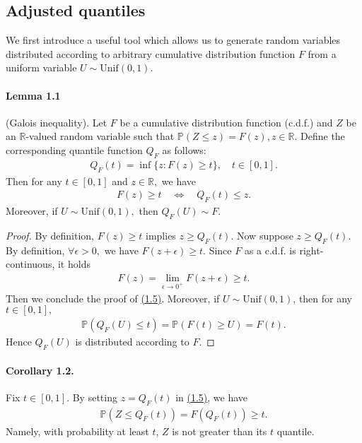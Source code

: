 \documentclass{article}
\numberwithin{equation}{section}
\begin{document}
\subsection{Adjusted quantiles}
We first introduce a useful tool which allows us to generate random variables distributed according to arbitrary cumulative distribution function $F$ from a uniform variable $U\sim\mathrm{Unif}(0,1).$
\paragraph{Lemma 1.1 \label{Lemma 1.1}} (Galois inequality). Let $F$ be a cumulative distribution function (c.d.f.) and $Z$ be an $\mathbb{R}$-valued random variable such that $\mathbb{P}(Z\leq z) = F(z), z\in\mathbb{R}.$ Define the corresponding quantile function $Q_F$ as follows:
\begin{align*}
	Q_F(t) = \inf\{z:F(z)\geq t\},\quad t\in[0,1].\tag{1.4}
\end{align*}
Then for any $t\in[0,1]$ and $z\in\mathbb{R},$ we have
\begin{align*}
	F(z)\geq t\quad\Leftrightarrow\quad Q_F(t)\leq z.\tag{1.5}\label{1.5}
\end{align*}
Moreover, if $U\sim\mathrm{Unif}(0,1),$ then $Q_F(U)\sim F.$
\begin{proof}
By definition, $F(z)\geq t$ implies $z\geq Q_F(t).$ Now suppose $z\geq Q_F(t).$ By definition, $\forall \epsilon >0,$ we have $F(z+\epsilon)\geq t.$ Since $F$ as a c.d.f. is right-continuous, it holds
\begin{align*}
	F(z) = \lim_{\epsilon\to 0^+}F(z+\epsilon) \geq t.\tag{1.6}
\end{align*}
Then we conclude the proof of \hyperref[1.5]{(1.5)}. Moreover, if $U\sim\mathrm{Unif}(0,1)$, then for any $t\in[0,1],$
\begin{align*}
	\mathbb{P}(Q_F(U)\leq t) = \mathbb{P}(F(t)\geq U) = F(t).\tag{1.7}
\end{align*}
Hence $Q_F(U)$ is distributed according to $F$.
\end{proof}

\paragraph{Corollary 1.2. \label{Corollary 1.2}} Fix $t\in [0,1].$ By setting $z=Q_F(t)$ in \hyperref[1.5]{(1.5)}, we have
\begin{align*}
	\mathbb{P}(Z\leq Q_F(t)) = F(Q_F(t))\geq t.\tag{1.8}
\end{align*}
Namely, with probability at least $t$, $Z$ is not greater than its $t$ quantile.
\end{document}
